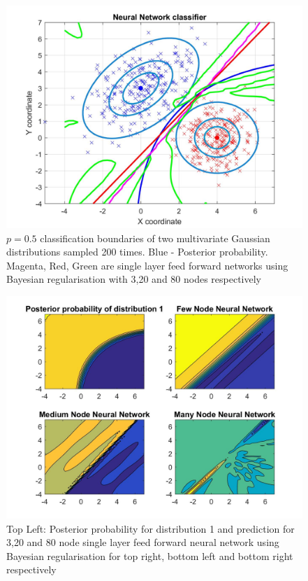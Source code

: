 \documentclass[a4paper,10pt, twocolumn]{article}
\begin{document}
\begin{figure}[ht]
	\includegraphics[width=0.9\linewidth]{NeuralNetworkClassification.jpg}
	\centering
	\caption{$p=0.5$ classification boundaries of two multivariate Gaussian distributions sampled 200 times. Blue - Posterior probability. Magenta, Red, Green are single layer feed forward networks using Bayesian regularisation with 3,20  and 80 nodes respectively }
		\label{fig:NNcontours}
\end{figure}

\begin{figure}[ht]
	\includegraphics[width=0.9\linewidth]{neuralNetSurf.jpg}
	\centering
	\caption{Top Left: Posterior probability for distribution 1 and prediction for 3,20 and 80 node single layer feed forward neural network using Bayesian regularisation for top right, bottom left and bottom right respectively }
		\label{fig:NNsurf}
\end{figure}
\end{document}
